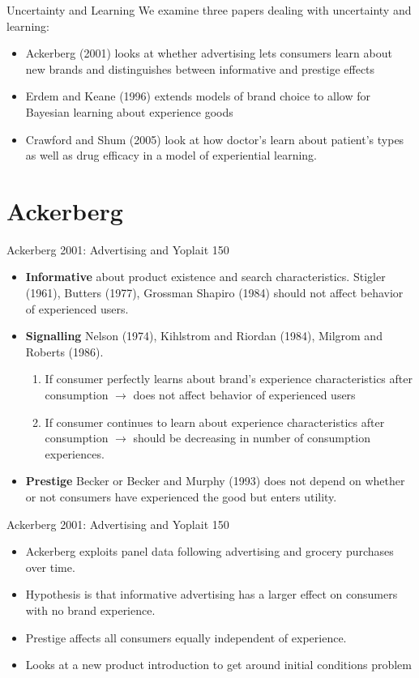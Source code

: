 \documentclass[xcolor=pdftex,dvipsnames,table,mathserif]{beamer}
\begin{document}
 
\begin{frame}{Uncertainty and Learning}
We examine three papers dealing with uncertainty and learning:
\begin{itemize}
\item Ackerberg (2001) looks at whether advertising lets consumers learn about new brands and distinguishes between informative and prestige effects
\item Erdem and Keane (1996) extends models of brand choice to allow for Bayesian learning about experience goods
\item Crawford and Shum (2005) look at how doctor's learn about patient's types as well as drug efficacy in a model of experiential learning.
\end{itemize}
\end{frame}

\section*{Ackerberg}
\begin{frame}{Ackerberg 2001: Advertising and Yoplait 150}
\begin{itemize}
\item \textbf{Informative} about product existence and search characteristics. Stigler (1961), Butters (1977), Grossman Shapiro (1984) should not affect behavior of experienced users.
\item \textbf{Signalling} Nelson (1974), Kihlstrom and Riordan (1984), Milgrom and Roberts (1986).
\begin{enumerate}
\item If consumer perfectly learns about brand's experience characteristics after consumption $\rightarrow$ does not affect behavior of experienced users
\item If consumer continues to learn about  experience characteristics after consumption $\rightarrow$ should be decreasing in number of consumption experiences.
\end{enumerate}
\item \textbf{Prestige} Becker or Becker and Murphy (1993) does not depend on whether or not consumers have experienced the good but enters utility.
\end{itemize}
\end{frame}

\begin{frame}{Ackerberg 2001: Advertising and Yoplait 150}
\begin{itemize}
\item Ackerberg exploits panel data following advertising and grocery purchases over time.
\item Hypothesis is that \alert{informative} advertising has a larger effect on consumers with no brand experience.
\item \alert{Prestige} affects all consumers equally independent of experience.
\item Looks at a new product introduction to get around \alert{initial conditions problem}
\end{itemize}
\end{frame}
\end{document}
